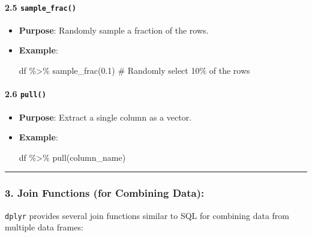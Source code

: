 \documentclass[
  letterpaper,
  DIV=11,
  numbers=noendperiod]{scrartcl}
\let\oldparagraph\paragraph
\renewcommand{\paragraph}[1]{\oldparagraph{#1}\mbox{}}
\newenvironment{Shaded}{\begin{snugshade}}{\end{snugshade}}
\newcommand{\CommentTok}[1]{\textcolor[rgb]{0.37,0.37,0.37}{#1}}
\newcommand{\FloatTok}[1]{\textcolor[rgb]{0.68,0.00,0.00}{#1}}
\newcommand{\FunctionTok}[1]{\textcolor[rgb]{0.28,0.35,0.67}{#1}}
\newcommand{\NormalTok}[1]{\textcolor[rgb]{0.00,0.23,0.31}{#1}}
\newcommand{\SpecialCharTok}[1]{\textcolor[rgb]{0.37,0.37,0.37}{#1}}
\begin{document}
\paragraph{\texorpdfstring{\textbf{2.5
\texttt{sample\_frac()}}}{2.5 sample\_frac()}}\label{sample_frac}

\begin{itemize}
\item
  \textbf{Purpose}: Randomly sample a fraction of the rows.
\item
  \textbf{Example}:

\begin{Shaded}
\begin{Highlighting}[]
\NormalTok{df }\SpecialCharTok{\%\textgreater{}\%} \FunctionTok{sample\_frac}\NormalTok{(}\FloatTok{0.1}\NormalTok{)  }\CommentTok{\# Randomly select 10\% of the rows}
\end{Highlighting}
\end{Shaded}
\end{itemize}

\paragraph{\texorpdfstring{\textbf{2.6
\texttt{pull()}}}{2.6 pull()}}\label{pull}

\begin{itemize}
\item
  \textbf{Purpose}: Extract a single column as a vector.
\item
  \textbf{Example}:

\begin{Shaded}
\begin{Highlighting}[]
\NormalTok{df }\SpecialCharTok{\%\textgreater{}\%} \FunctionTok{pull}\NormalTok{(column\_name)}
\end{Highlighting}
\end{Shaded}
\end{itemize}

\begin{center}\rule{0.5\linewidth}{0.5pt}\end{center}

\subsubsection{\texorpdfstring{3. \textbf{Join Functions (for Combining
Data):}}{3. Join Functions (for Combining Data):}}\label{join-functions-for-combining-data}

\texttt{dplyr} provides several join functions similar to SQL for
combining data from multiple data frames:
\end{document}
